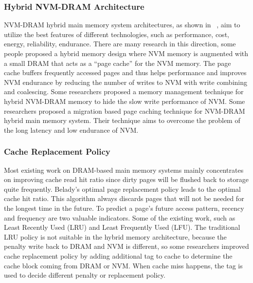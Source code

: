 \subsubsection{Hybrid NVM-DRAM Architecture}
NVM-DRAM hybrid main memory system architectures, as shown in ~, aim to utilize the best features of different technologies, such as performance, cost, energy, reliability, endurance. There are many research in this direction, some people proposed a hybrid memory design where NVM memory is augmented with a small DRAM that acts as a “page cache” for the NVM memory. The page cache buffers frequently accessed pages and thus helps performance and improves NVM endurance by reducing the number of writes to NVM with write combining and coalescing. Some researchers proposed a memory management technique for hybrid NVM-DRAM memory to hide the slow write performance of NVM. Some researchers proposed a migration based page caching technique for NVM-DRAM hybrid main memory system. Their technique aims to overcome the problem of the long latency and low endurance of NVM.    



\subsubsection{Cache Replacement Policy}
Most existing work on DRAM-based main memory systems mainly concentrates on improving cache read hit ratio since dirty pages will be flushed back to storage quite frequently. Belady’s optimal page replacement policy leads to the optimal cache hit ratio. This algorithm always discards pages that will not be needed for the longest time in the future. To predict a page’s future access pattern, recency and frequency are two valuable indicators. Some of the existing work, such as Least Recently Used (LRU) and Least Frequently Used (LFU). The traditional LRU policy is not suitable in the hybrid memory architecture, because the penalty write back to DRAM and NVM is different, so some researchers improved cache replacement policy by adding additional tag to cache to determine the cache block coming from DRAM or NVM. When cache miss happens, the tag is used to decide different penalty or replacement policy.    





